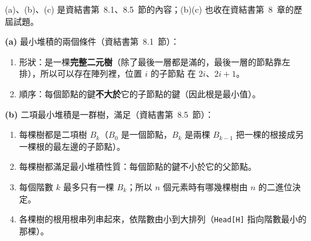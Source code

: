 \begin{pastsoln}
(a)、(b)、(c) 是資結書第~8.1、8.5~節的內容；(b)(c) 也收在資結書第~8~章的歷屆試題。

\textbf{(a)} 最小堆積的兩個條件（資結書第~8.1~節）：
\begin{enumerate}
\item 形狀：是一棵\textbf{完整二元樹}（除了最後一層都是滿的，最後一層的節點靠左排），所以可以存在陣列裡，位置 $i$ 的子節點
在 $2i$、$2i+1$。
\item 順序：每個節點的鍵\textbf{不大於}它的子節點的鍵（因此根是最小值）。
\end{enumerate}

\textbf{(b)} 二項最小堆積是一群樹，滿足（資結書第~8.5~節）：
\begin{enumerate}
\item 每棵樹都是二項樹 $B_k$（$B_0$ 是一個節點，$B_k$ 是兩棵 $B_{k-1}$ 把一棵的根接成另一棵根的最左邊的子節點）。
\item 每棵樹都滿足最小堆積性質：每個節點的鍵不小於它的父節點。
\item 每個階數 $k$ 最多只有一棵 $B_k$；所以 $n$ 個元素時有哪幾棵樹由 $n$ 的二進位決定。
\item 各棵樹的根用根串列串起來，依階數由小到大排列（\texttt{Head[H]} 指向階數最小的那棵）。
\end{enumerate}


\end{pastsoln}

